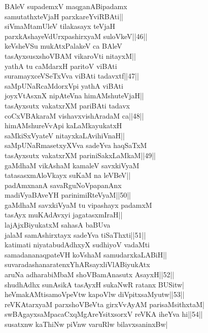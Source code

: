 \documentclass{article}
\begin{document}
BAleV supademxV maqganABipadamx\\
samutathxteVjaH parxkareYviRBAti||\\
siVmaMtamUleV tilakasayx teVjaH\\
parxkAshayeVdUrxpashirxyaM suloVkeV||46||\\
keVsheVSu mukAtxPalakeV ca BAleV\\
tasAyxsusxshoVBAM vikaroVti nitayxM||\\
yathA tu caMdarxH paritoV viBAti\\
suramayxceVSeTxVva viBAti tadavxtf||47||\\
saMpUNaRcaMdorxVpi yathA viBAti\\
joyxVtAsxnX nipAteVna himAMshuteVjaH||\\
tasAyxsutx vakatxrXM pariBAti tadavx\\
coCxVBAkaraM vishavxvishAradaM ca||48||\\
himAMshureVvApi kaLaMkayukatxH\\
saMkiSxVyateV nitayxkaLAvihiVnaH||\\
saMpUNaRmasetxyXVva sadeYva haqSaTxM\\
tasAyxsutx vakatxrXM pariniSakxLaMkaM||49||\\
gaMdhaM vikAshaM kamaleV savxkiVyaM\\
tatasasxmAloVkayx suKaM na leVBeV||\\
padAmxnanA savaRguNoVpapanAnx\\
madiVyaBAveYH parinimiRteVyaM||50||\\
gaMdhaM savxkiVyaM tu vipashayx padamxM\\
tasAyx muKAdAvxyi jagatasxmIraH||\\
lajAjxBiyukatxM sahasA baBUva\\
jalaM samAshirxtayx sadeYva tiSaThxti||51||\\
katimati niyatabudAdhxyX sudhiyoV vadaMti\\
samadananaqpateVH koVshaM samudarxkaLABiH||\\
suvaradashanaratenxYhARsayxliVlABiyukAtx\\
aruNa adharabiMbaM shoVBamAnasutx AsayxH||52||\\
shudhAdhx sunAsikA tasAyxH sukaNwR ratanx BUSitw|\\
heVmakAMtisamoVpeVtw kapoVlw diVpitxsaMyutw||53||\\
reVKAtarxyaM parxshoVBeVta girxVvAyAM parisaMsithxtaM|\\
swBAgayxsaMpacaCxqMgAreYsitxsorxV reVKA iheYva hi||54||\\
susatxnw kaThiNw piVnw varuRlw bilavxsaninxBw|\\
\end{document}
